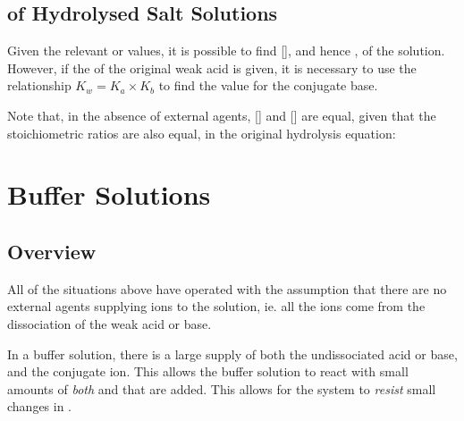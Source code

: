 

		\subsection{\MpH{} of Hydrolysed Salt Solutions}

			Given the relevant \Ka{} or \Kb{} values, it is possible to find [], and hence \pH{}, of the solution. However,
			if the \Ka{} of the original weak acid is given, it is necessary to use the relationship $K_{w} = K_{a} \times K_{b}$ to find
			the \Kb{} value for the conjugate base.


			Note that, in the absence of external agents, [] and [] are equal, given that the stoichiometric ratios
			are also equal, in the original hydrolysis equation:








	\pagebreak
	\section{Buffer Solutions}

		\subsection{Overview}

			All of the situations above have operated with the assumption that there are no external agents supplying ions to the solution,
			ie. all the ions come from the dissociation of the weak acid or base.

			In a buffer solution, there is a large supply of both the undissociated acid or base, and the conjugate ion. This allows the
			buffer solution to react with small amounts of \textit{both}  and  that are added. This allows for the system
			to \textit{resist} small changes in \pH{}.

